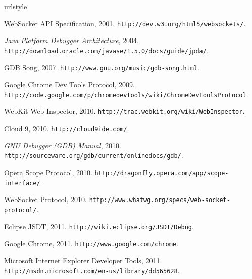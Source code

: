 \documentclass[10pt]{sigplanconf}
\begin{document}



%


\begin{thebibliography}{27}
\providecommand{\natexlab}[1]{#1}
\providecommand{\url}[1]{\texttt{#1}}
\expandafter\ifx\csname urlstyle\endcsname\relax
  \providecommand{\doi}[1]{doi: #1}\else
  \providecommand{\doi}{doi: \begingroup \urlstyle{rm}\Url}\fi

Web{S}ocket {API} {S}pecification, 2001.
\newblock \url{http://dev.w3.org/html5/websockets/}.

\emph{Java {P}latform {D}ebugger {A}rchitecture}, 2004.
\newblock \url{http://download.oracle.com/javase/1.5.0/docs/guide/jpda/}.

{GDB} {S}ong, 2007.
\newblock \url{http://www.gnu.org/music/gdb-song.html}.

Google {C}hrome {D}ev {T}ools {P}rotocol, 2009.
\newblock
  \url{http://code.google.com/p/chromedevtools/wiki/ChromeDevToolsProtocol}.

Web{K}it {W}eb {I}nspector, 2010.
\newblock \url{http://trac.webkit.org/wiki/WebInspector}.

Cloud 9, 2010.
\newblock \url{http://cloud9ide.com/}.

\emph{{GNU} {D}ebugger ({GDB}) {M}anual}, 2010.
\newblock \url{http://sourceware.org/gdb/current/onlinedocs/gdb/}.

Opera {S}cope {P}rotocol, 2010.
\newblock \url{http://dragonfly.opera.com/app/scope-interface/}.

Web{S}ocket {P}rotocol, 2010.
\newblock \url{http://www.whatwg.org/specs/web-socket-protocol/}.

Eclipse {JSDT}, 2011.
\newblock \url{http://wiki.eclipse.org/JSDT/Debug}.

Google {C}hrome, 2011.
\newblock \url{http://www.google.com/chrome}.

Microsoft {I}nternet {Explorer} {D}eveloper {T}ools, 2011.
\newblock \protect\url{http://msdn.microsoft.com/en-us/library/dd565628}.


\end{thebibliography}
\end{document}
